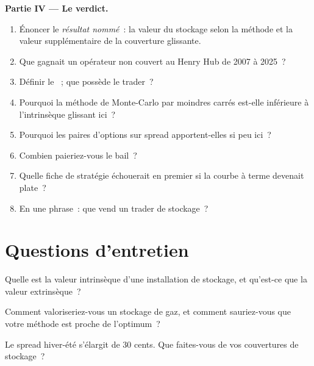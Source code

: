 \begin{problem}
\medskip\noindent\textbf{Partie IV --- Le verdict.}
\begin{enumerate}[resume]
\item Énoncer le \emph{résultat nommé}~: la valeur du stockage selon la méthode et la valeur supplémentaire de la couverture glissante.
\item Que gagnait un opérateur non couvert au Henry Hub de 2007 à 2025~?
\item Définir le ~; que possède le trader~?
\item Pourquoi la méthode de Monte-Carlo par moindres carrés est-elle inférieure à l'intrinsèque glissant ici~?
\item Pourquoi les paires d'options sur spread apportent-elles si peu ici~?
\item Combien paieriez-vous le bail~?
\item Quelle fiche de stratégie échouerait en premier si la courbe à terme devenait plate~?
\item En une phrase~: que vend un trader de stockage~?
\end{enumerate}
\end{problem}

\section{Questions d'entretien}

\begin{interviewq}\label{iq:s2:storage-transport-and-physical-optionality:1}
Quelle est la valeur intrinsèque d'une installation de stockage, et qu'est-ce que la valeur extrinsèque~?
\end{interviewq}

\begin{interviewq}\label{iq:s2:storage-transport-and-physical-optionality:2}
Comment valoriseriez-vous un stockage de gaz, et comment sauriez-vous que votre méthode est proche de l'optimum~?
\end{interviewq}

\begin{interviewq}\label{iq:s2:storage-transport-and-physical-optionality:3}
Le spread hiver-été s'élargit de 30 cents. Que faites-vous de vos couvertures de stockage~?
\end{interviewq}


